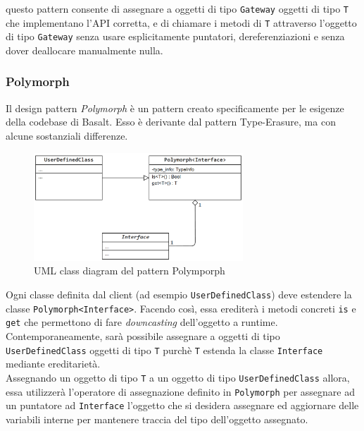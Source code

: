 \newpage

questo pattern consente di assegnare a oggetti di tipo \texttt{Gateway} oggetti di tipo \texttt{T} che implementano
l'API corretta, e di chiamare i metodi di \texttt{T} attraverso l'oggetto di tipo \texttt{Gateway} senza 
usare esplicitamente puntatori, dereferenziazioni e senza dover deallocare manualmente nulla. \\

\subsubsection{Polymorph}
Il design pattern \textit{Polymorph} è un pattern creato specificamente per le esigenze della codebase di Basalt. Esso 
è derivante dal pattern Type-Erasure, ma con alcune sostanziali differenze. \\

\begin{figure}[H]
    \centering
        \includegraphics[width=0.7\textwidth]{../../Assets/Polymorph.png}
    \caption{UML class diagram del pattern Polymporph}
\end{figure}

Ogni classe definita dal client (ad esempio \texttt{UserDefinedClass}) deve estendere la classe \texttt{Polymorph<Interface>}. 
Facendo così, essa erediterà i metodi concreti \texttt{is} e \texttt{get} che permettono di fare \textit{downcasting}
dell'oggetto a runtime. \\

Contemporaneamente, sarà possibile assegnare a oggetti di tipo \texttt{UserDefinedClass} oggetti di tipo \texttt{T} purchè 
\texttt{T} estenda la classe \texttt{Interface} mediante ereditarietà. \\

Assegnando un oggetto di tipo \texttt{T} a un oggetto di tipo \texttt{UserDefinedClass} allora, essa utilizzerà l'operatore 
di assegnazione definito in \texttt{Polymorph} per assegnare ad un puntatore ad \texttt{Interface} l'oggetto che si desidera assegnare
ed aggiornare delle variabili interne per mantenere traccia del tipo dell'oggetto assegnato. \\

